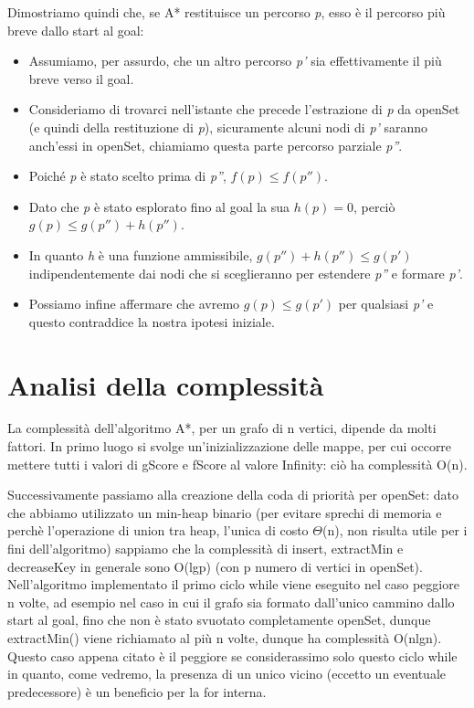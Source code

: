 \documentclass[12pt,a4paper]{report}
\begin{document}
Dimostriamo quindi che, se A* restituisce un percorso \emph{p}, esso è il percorso più breve dallo start al goal:
\begin{itemize}
	\item Assumiamo, per assurdo, che un altro percorso \emph{p'} sia effettivamente il più breve verso il goal.
	\item Consideriamo di trovarci nell'istante che precede l'estrazione di \emph{p} da openSet (e quindi della restituzione di \emph{p}), sicuramente alcuni nodi di \emph{p'} saranno anch'essi in openSet, chiamiamo questa parte percorso parziale \emph{p''}.
	\item Poiché \emph{p} è stato scelto prima di \emph{p''}, \(f(p) \leq f(p'')\).
	\item Dato che \emph{p} è stato esplorato fino al goal la sua \(h(p) = 0\), perciò\\ \(g(p) \leq g(p'') + h(p'')\).
	\item In quanto \emph{h} è una funzione ammissibile, \(g(p'') + h(p'') \leq g(p')\) indipendentemente dai nodi che si sceglieranno per estendere \emph{p''} e formare \emph{p'}.
	\item Possiamo infine affermare che avremo \(g(p) \leq g(p')\) per qualsiasi \emph{p'} e questo contraddice la nostra ipotesi iniziale.
\end{itemize}

\chapter{Analisi della complessità}

La complessità dell'algoritmo A*, per un grafo di n vertici, dipende da molti fattori.
In primo luogo si svolge un'inizializzazione delle mappe, per cui occorre mettere tutti i valori di gScore e fScore al valore Infinity: ciò ha complessità O(n).


Successivamente passiamo alla creazione della coda di priorità per openSet: dato che abbiamo utilizzato un min-heap binario (per evitare sprechi di memoria e perchè l'operazione di union tra heap, l'unica di costo \(\Theta\)(n), non risulta utile per i fini dell'algoritmo) sappiamo che la complessità di insert, extractMin e decreaseKey in generale sono O(lgp) (con p numero di vertici in openSet).
\\

Nell'algoritmo implementato il primo ciclo while viene eseguito nel caso peggiore n volte, ad esempio nel caso in cui il grafo sia formato dall'unico cammino dallo start al goal, fino che non è stato svuotato completamente openSet, dunque extractMin() viene richiamato al più n volte, dunque ha complessità O(nlgn).
Questo caso appena citato è il peggiore se considerassimo solo questo ciclo while in quanto, come vedremo, la presenza di un unico vicino (eccetto un eventuale predecessore) è un beneficio per la for interna.
\end{document}
